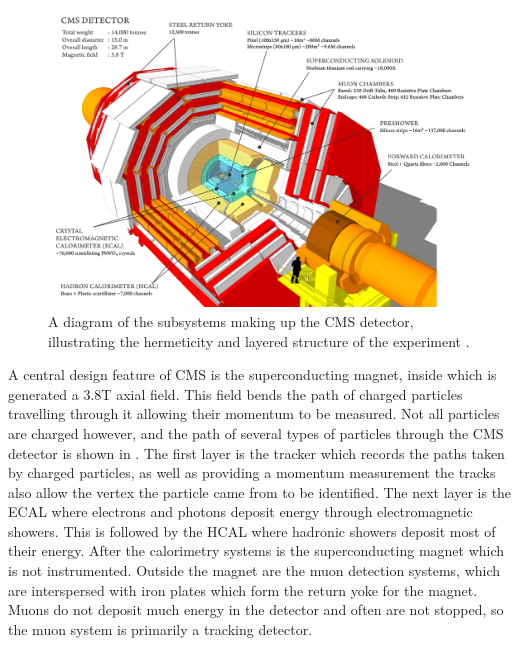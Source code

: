 \begin{figure}
  \includegraphics[width=1.2\largefigwidth]{plots/detector/cms_120918_03.png}
  \caption{A diagram of the subsystems making up the CMS detector, illustrating the hermeticity and layered structure of the experiment \cite{cmsschematic}.}
  \label{fig:cmsschematic1}
\end{figure}

A central design feature of CMS is the superconducting magnet, inside which is generated a 3.8T axial field. This field bends the path of charged particles travelling through it allowing their momentum to be measured. Not all particles are charged however, and the path of several types of particles through the CMS detector is shown in . The first layer is the tracker which records the paths taken by charged particles, as well as providing a momentum measurement the tracks also allow the vertex the particle came from to be identified. The next layer is the \ac{ECAL} where electrons and photons deposit energy through electromagnetic showers. This is followed by the \ac{HCAL} where hadronic showers deposit most of their energy. After the calorimetry systems is the superconducting magnet which is not instrumented. Outside the magnet are the muon detection systems, which are interspersed with iron plates which form the return yoke for the magnet. Muons do not deposit much energy in the detector and often are not stopped, so the muon system is primarily a tracking detector.

